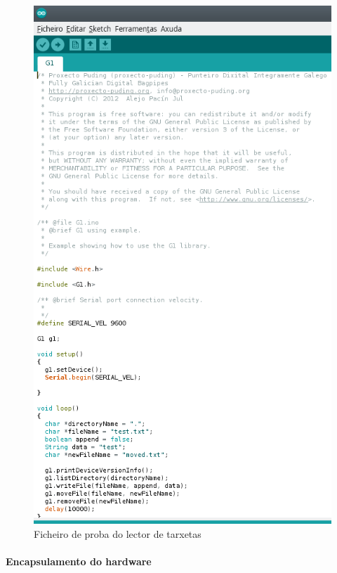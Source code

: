    \begin{figure}[htbp]
    \centering
    \includegraphics[scale=0.8,keepaspectratio=true]{./imagenes/test-lector-tarxetas.png}
    \caption{Ficheiro de proba do lector de tarxetas}
    \label{figura:TestLectorTarxetas}
   \end{figure}

   \paragraph{Encapsulamento do hardware}\mbox{}\\
   
